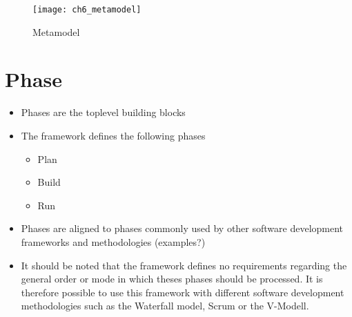 \begin{figure}
	[htpb] \centering 
	\texttt{[image: ch6\_metamodel]} 
	\caption{Metamodel} 
	\label{fig:ch6_metamodel} 
\end{figure}

\section{Phase}

\begin{itemize}
	\item Phases are the toplevel building blocks
	\item The framework defines the following phases
	\begin{itemize}
		\item Plan
		\item Build
		\item Run
	\end{itemize}
	\item Phases are aligned to phases commonly used by other software development frameworks and methodologies (examples?)
	\item It should be noted that the framework defines no requirements regarding the general order or mode in which theses phases should be processed. It is therefore possible to use this framework with different software development methodologies such as the Waterfall model, Scrum or the V-Modell.
\end{itemize}

